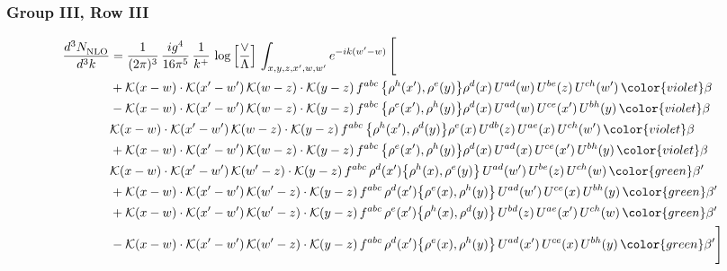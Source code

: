\subsubsection{Group III, Row III} 
\begin{align}
     \frac{d^{3}N_{\rm NLO}^{\rm}}{d^{3}k}  & = \frac{1}{(2\pi)^{3}}\, \frac{ig^{4}}{16\pi^{5}}\, \frac{1}{k^{+}}\, \log{\left[\frac{\vee}{\Lambda}\right]}\, \int_{x,y,z,x^{\prime},w,w^{\prime}}e^{-ik(w^{\prime}-w)}\, \Bigg[\notag \\ & +\mathcal{K}(x-w)\cdot\mathcal{K}(x'-w')\,\mathcal{K}(w-z)\cdot\mathcal{K}(y-z)\, f^{abc}\,\big\{\rho^{h}(x'),\rho^{e}(y)\big\}\rho^{d}(x)\,U^{ad}(w)\,U^{be}(z)\,U^{ch}(w')\,{\color{violet}\beta}\notag\\
&-\mathcal{K}(x-w)\cdot\mathcal{K}(x'-w')\,\mathcal{K}(w-z)\cdot\mathcal{K}(y-z)\, f^{abc}\,\big\{\rho^{e}(x'),\rho^{h}(y)\big\}\rho^{d}(x)\,U^{ad}(w)\,U^{ce}(x')\,U^{bh}(y)\,{\color{violet}\beta}\notag\\ &\-\mathcal{K}(x-w)\cdot\mathcal{K}(x'-w')\,\mathcal{K}(w-z)\cdot\mathcal{K}(y-z)\, f^{abc}\,\big\{\rho^{h}(x'),\rho^{d}(y)\big\}\rho^{e}(x)\,U^{db}(z)\,U^{ae}(x)\,U^{ch}(w')\,{\color{violet}\beta}\notag\\ & +\mathcal{K}(x-w)\cdot\mathcal{K}(x'-w')\,\mathcal{K}(w-z)\cdot\mathcal{K}(y-z)\, f^{abc}\,\big\{\rho^{e}(x'),\rho^{h}(y)\big\}\rho^{d}(x)\,U^{ad}(x)\,U^{ce}(x')\,U^{bh}(y)\,{\color{violet}\beta}\notag\\ &\-\mathcal{K}(x-w)\cdot\mathcal{K}(x'-w')\,\mathcal{K}(w'-z)\cdot\mathcal{K}(y-z)\, f^{abc}\,\rho^{d}(x')\big\{\rho^{h}(x),\rho^{e}(y)\big\}\,U^{ad}(w')\,U^{be}(z)\,U^{ch}(w)\,{\color{green}\beta'}\notag\\ &+\mathcal{K}(x-w)\cdot\mathcal{K}(x'-w')\,\mathcal{K}(w'-z)\cdot\mathcal{K}(y-z)\, f^{abc}\,\rho^{d}(x')\big\{\rho^{e}(x),\rho^{h}(y)\big\}\,U^{ad}(w')\,U^{ce}(x)\,U^{bh}(y)\,{\color{green}\beta'} \notag\\ & +\mathcal{K}(x-w)\cdot\mathcal{K}(x'-w')\,\mathcal{K}(w'-z)\cdot\mathcal{K}(y-z)\, f^{abc}\,\rho^{e}(x')\big\{\rho^{h}(x),\rho^{d}(y)\big\}\,U^{bd}(z)\,U^{ae}(x')\,U^{ch}(w)\,{\color{green}\beta'} \notag\\ & -\mathcal{K}(x-w)\cdot\mathcal{K}(x'-w')\,\mathcal{K}(w'-z)\cdot\mathcal{K}(y-z)\, f^{abc}\,\rho^{d}(x')\big\{\rho^{e}(x),\rho^{h}(y)\big\}\,U^{ad}(x')\,U^{ce}(x)\,U^{bh}(y)\,{\color{green}\beta'}\Bigg]\end{align}     
